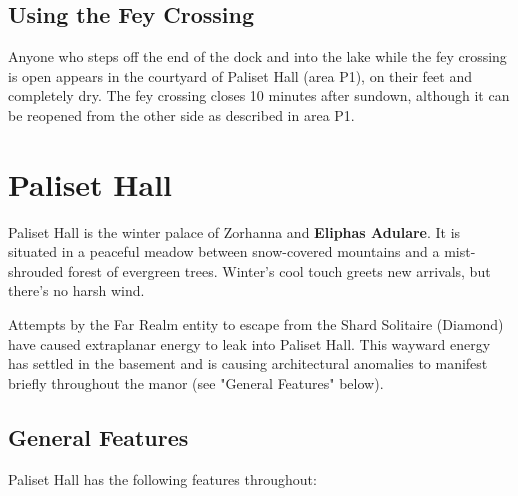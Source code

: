 \documentclass[10pt,a4paper,twoside,bg=print,twocolumn,openany,nodeprecatedcode]{dndbook}
\begin{document}
\subsection{Using the Fey Crossing}
Anyone who steps off the end of the dock and into the lake while the fey crossing is open appears in the courtyard of Paliset Hall (area P1), on their feet and completely dry. The fey crossing closes 10 minutes after sundown, although it can be reopened from the other side as described in area P1.

\section{Paliset Hall}
Paliset Hall is the winter palace of Zorhanna and \textbf{Eliphas Adulare}. It is situated in a peaceful meadow between snow-covered mountains and a mist-shrouded forest of evergreen trees. Winter's cool touch greets new arrivals, but there's no harsh wind.

Attempts by the Far Realm entity to escape from the Shard Solitaire (Diamond) have caused extraplanar energy to leak into Paliset Hall. This wayward energy has settled in the basement and is causing architectural anomalies to manifest briefly throughout the manor (see "General Features" below).

\subsection{General Features}
Paliset Hall has the following features throughout:
\end{document}
